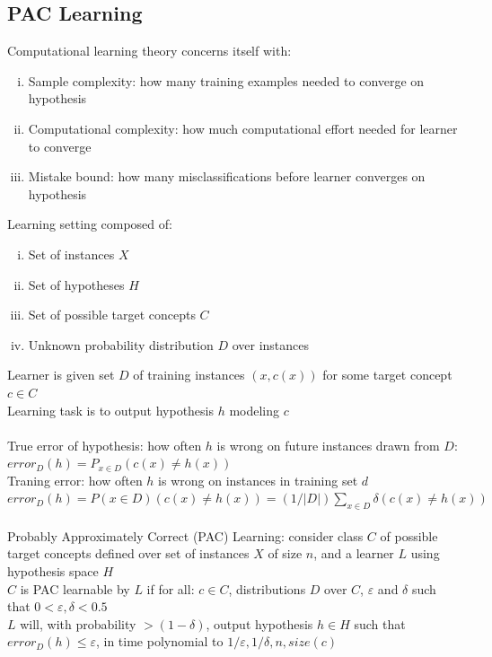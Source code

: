 \documentclass{article}
\begin{document}
		\subsection{PAC Learning}
			Computational learning theory concerns itself with: 
			\begin{enumerate}[(i)]
				\item Sample complexity: how many training examples needed to converge on hypothesis
				\item Computational complexity: how much computational effort needed for learner to converge
				\item Mistake bound: how many misclassifications before learner converges on hypothesis
				\end{enumerate}
			Learning setting composed of:
			\begin{enumerate}[(i)]
				\item Set of instances $X$
				\item Set of hypotheses $H$
				\item Set of possible target concepts $C$
				\item Unknown probability distribution $D$ over instances
				\end{enumerate}
			Learner is given set $D$ of training instances $(x, c(x))$ for some target concept $c \in C$ \\
			Learning task is to output hypothesis $h$ modeling $c$ \\
			\\
			True error of hypothesis: how often $h$ is wrong on future instances drawn from $D$: \\
			$error_D(h) = P_{x \in D}(c(x) \neq h(x))$ \\
			Traning error: how often $h$ is wrong on instances in training set $d$ \\
			$error_D(h) = P(x \in D)(c(x) \neq h(x)) = (1/|D|)\sum_{x \in D}\delta(c(x) \neq h(x))$ \\
			\\
			Probably Approximately Correct (PAC) Learning: consider class $C$ of possible target concepts defined over set of instances $X$ of size $n$, and a learner $L$ using hypothesis space $H$ \\
			$C$ is PAC learnable by $L$ if for all: $c \in C$, distributions $D$ over $C$, $\varepsilon$ and $\delta$ such that $0 < \varepsilon, \delta < 0.5$ \\
			$L$ will, with probability $> (1 - \delta)$, output hypothesis $h \in H$ such that $error_D(h) \leq \varepsilon$, in time polynomial to $1/\varepsilon, 1/\delta, n, size(c)$ \\
\end{document}
